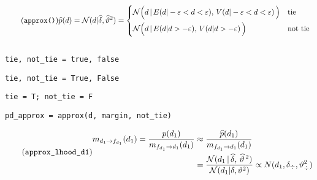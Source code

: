 \documentclass[article]{jss}
\newif\ifen
\newif\ifes
\newcommand{\en}[1]{\ifen#1\fi}
\newcommand{\es}[1]{\ifes#1\fi}
\newcommand{\N}{\mathcal{N}}
\begin{document}
%
\en{Then, the Gaussian that best approximates $p(d_1)$ in a winning case is}
\es{Luego, la Gaussiana que mejor aproxima a $p(d_1)$ en un caso ganador es}
%
\begin{equation}\label{eq:p*_d} \tag{\texttt{approx()}}
 \widehat{p}(d) = \N(d | \widehat{\delta}, \widehat{\vartheta}^2) =
 \begin{cases*}
 \N\Big(d \,  | \, E(d | -\varepsilon < d < \varepsilon ) , \,  V(d | -\varepsilon < d < \varepsilon ) \, \Big) & \text{tie} \\
\N\Big(d \,  | \, E(d | d > -\varepsilon ) , \,  V(d | d > -\varepsilon ) \, \Big) & \text{not tie}
  \end{cases*}
\end{equation}
%
\begin{lstlisting}[backgroundcolor=\color
{white},label=lst:pd_approx, caption=\relax, belowskip=-1.0 \baselineskip, aboveskip=-0 \baselineskip]
\end{lstlisting}
\begin{paracol}{3}
\begin{lstlisting}[backgroundcolor=\color{julia},belowskip=-0.77 \baselineskip]
tie, not_tie = true, false
\end{lstlisting}
\switchcolumn
\begin{lstlisting}[backgroundcolor=\color{python},belowskip=-0.77 \baselineskip]
tie, not_tie = True, False
\end{lstlisting}
\switchcolumn
\begin{lstlisting}[backgroundcolor=\color{r},belowskip=-0.77 \baselineskip]
tie = T; not_tie = F 
\end{lstlisting}
\end{paracol}
\begin{lstlisting}[backgroundcolor=\color{all}]
pd_approx = approx(d, margin, not_tie)
\end{lstlisting}
%
\en{Given $\widehat{p}(d_1)$, we can compute the approximate ascending message.}
\es{Dada $\widehat{p}(d_1)$, podemos calcular el mensaje ascendentes aproximado.}
%
\begin{equation}\label{eq:m^_d_fd} \tag{\texttt{approx\_lhood\_d1}}
\begin{split}
 m_{d_1 \rightarrow f_{d_1}}(d_1)   = \frac{p(d_1)}{m_{f_{d_1} \rightarrow d_1}(d_1)} 
 & \approx \frac{\widehat{p}(d_1)}{m_{f_{d_1} \rightarrow d_1}(d_1)}  \\
& = \frac{\N(d_1 \,  | \,\widehat{\delta} , \, \widehat{\vartheta}^{\,2} )}{\N(d_1 | \delta, \vartheta^2)} 
\propto N(d_1,\delta_{\div},\vartheta_{\div}^2 )
\end{split}
\end{equation}
\end{document}
